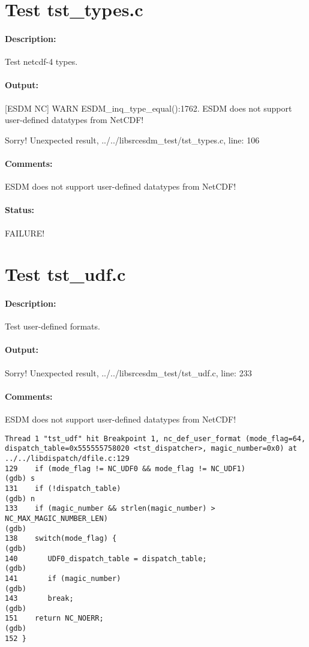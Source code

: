 \section{Test tst\_types.c}

\paragraph{Description:} Test netcdf-4 types.

\paragraph{Output:} [ESDM NC] WARN ESDM\_inq\_type\_equal():1762. ESDM does not support user-defined datatypes from NetCDF!

Sorry! Unexpected result, ../../libsrcesdm\_test/tst\_types.c, line: 106

\paragraph{Comments:} ESDM does not support user-defined datatypes from NetCDF!

\paragraph{Status:} FAILURE!

\section{Test tst\_udf.c}

\paragraph{Description:} Test user-defined formats.

\paragraph{Output:} Sorry! Unexpected result, ../../libsrcesdm\_test/tst\_udf.c, line: 233

\paragraph{Comments:} ESDM does not support user-defined datatypes from NetCDF!

\begin{verbatim}
Thread 1 "tst_udf" hit Breakpoint 1, nc_def_user_format (mode_flag=64, dispatch_table=0x555555758020 <tst_dispatcher>, magic_number=0x0) at ../../libdispatch/dfile.c:129
129	   if (mode_flag != NC_UDF0 && mode_flag != NC_UDF1)
(gdb) s
131	   if (!dispatch_table)
(gdb) n
133	   if (magic_number && strlen(magic_number) > NC_MAX_MAGIC_NUMBER_LEN)
(gdb)
138	   switch(mode_flag) {
(gdb)
140	      UDF0_dispatch_table = dispatch_table;
(gdb)
141	      if (magic_number)
(gdb)
143	      break;
(gdb)
151	   return NC_NOERR;
(gdb)
152	}
\end{verbatim}

